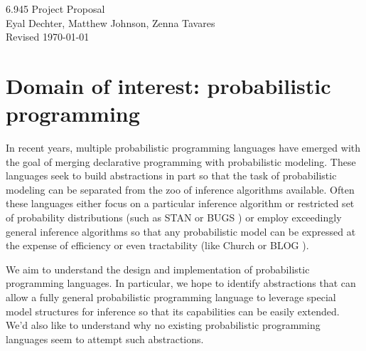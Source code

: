 \documentclass{article}
\begin{document}
    \begin{center}
        \Large
        6.945 Project Proposal\\
        \vspace{0.2in}
        \normalsize
        Eyal Dechter, Matthew Johnson, Zenna Tavares\\
        \vspace{0.1in}
        \footnotesize
        Revised \today
    \end{center}

    \section{Domain of interest: probabilistic programming}
    In recent years, multiple probabilistic programming languages have emerged
    with the goal of merging declarative programming with probabilistic
    modeling. These languages seek to build abstractions in part so that the
    task of probabilistic modeling can be separated from the zoo of inference
    algorithms available. Often these languages either focus on a particular
    inference algorithm or restricted set of probability distributions (such as
    STAN \cite{stan} or BUGS \cite{bugs}) or employ exceedingly general inference algorithms so
    that any probabilistic model can be expressed at the expense of efficiency
    or even tractability (like Church \cite{church} or BLOG \cite{blog}).

    We aim to understand the design and implementation of probabilistic
    programming languages. In particular, we hope to identify abstractions that
    can allow a fully general probabilistic programming language to leverage
    special model structures for inference so that its capabilities can be
    easily extended. We'd also like to understand why no existing probabilistic
    programming languages seem to attempt such abstractions.
\end{document}
